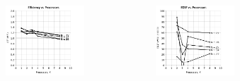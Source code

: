 \documentclass[handout,10pt]{beamer}
\begin{document}
\begin{frame}
\begin{columns}
\begin{figure}
	\end{figure}
\begin{minipage}[c][.6\textheight][c]{\linewidth}
	\vspace{-1em}
	\begin{figure}
	\centering
	\includegraphics[scale = 0.25]{e_speed_2.png}
	\end{figure}
	\vspace{-2em}
	\begin{figure}
	\centering
	\includegraphics[scale = 0.25]{e_speed_1.png}
	\end{figure}
\end{minipage}
\end{columns}
\end{frame}
\end{document}
